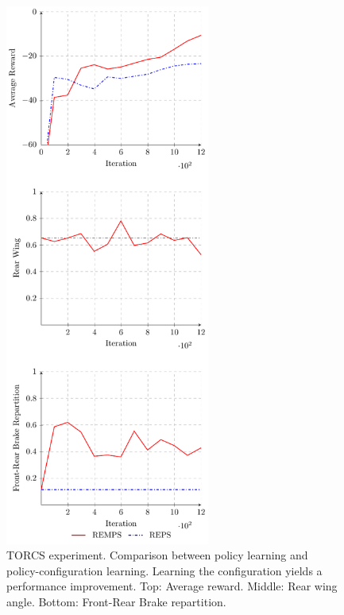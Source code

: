 \begin{figure}[!tb]
\centering
\includegraphics[width = 0.6\textwidth]{plots/torcs/plot_torcs}
\caption{TORCS experiment. Comparison between policy learning and policy-configuration learning. Learning the configuration yields a performance improvement. Top: Average reward. Middle: Rear wing angle. Bottom: Front-Rear Brake repartition.}
\label{fig:torcs}
\end{figure}